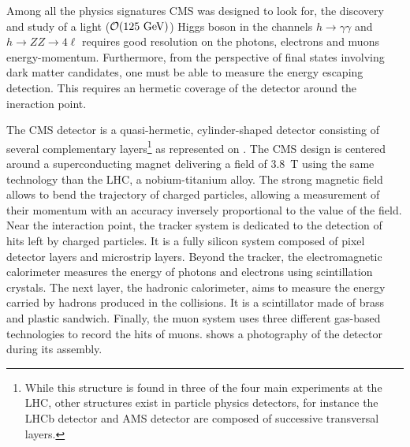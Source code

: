     Among all the physics signatures CMS was designed to look for, the discovery
    and study of a light ($\mathcal{O}(125 ~\text{GeV})$) Higgs boson in the channels
    $h\rightarrow\gamma\gamma$ and $h\rightarrow ZZ \rightarrow 4\ell$ requires
    good resolution on the photons, electrons and muons energy-momentum.
    Furthermore, from the perspective of final states involving dark matter
    candidates, one must be able to measure the energy escaping detection. This
    requires an hermetic coverage of the detector around the ineraction point.


    The CMS detector is a quasi-hermetic, cylinder-shaped detector consisting of
    several complementary layers\footnote{While this structure is found in three
    of the four main experiments at the LHC, other structures exist in particle
    physics detectors, for instance the LHCb detector and AMS detector are
    composed of successive transversal layers.} as represented on
    .  The CMS design is centered around a
    superconducting magnet delivering a field of 3.8~T using the same technology
    than the LHC, a nobium-titanium alloy. The strong magnetic field allows to
    bend the trajectory of charged particles, allowing a measurement of their
    momentum with an accuracy inversely proportional to the value of the field.
    Near the interaction point, the tracker system is dedicated to the detection
    of hits left by charged particles. It is a fully silicon system composed of
    pixel detector layers and microstrip layers. Beyond the tracker, the
    electromagnetic calorimeter measures the energy of photons and electrons
    using scintillation crystals. The next layer, the hadronic calorimeter, aims
    to measure the energy carried by hadrons produced in the collisions. It is a
    scintillator made of brass and plastic sandwich. Finally, the muon system
    uses three different gas-based technologies to record the hits of muons.
     shows a photography of the detector during
    its assembly.


